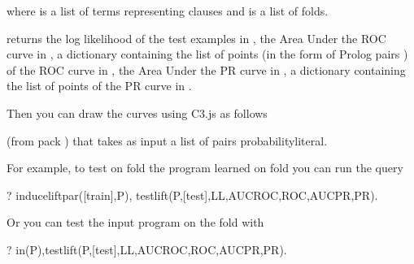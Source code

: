 \documentclass[letterpaper,10pt,english]{sphinxmanual}
\begin{document}
\sphinxAtStartPar
where  is a list of terms representing clauses and  is a list of folds.

\sphinxAtStartPar
{} returns the log likelihood of the test examples in , the Area Under the ROC curve in , a dictionary containing the list of points (in the form of Prolog pairs ) of the ROC curve in , the Area Under the PR curve in , a dictionary containing the list of points of the PR curve in .

\sphinxAtStartPar
Then you can draw the curves using C3.js as follows

\begin{sphinxVerbatim}[commandchars=\\\{\}]
  
\end{sphinxVerbatim}

\sphinxAtStartPar
(from pack ) that takes as input a list  of pairs probability\sphinxhyphen{}literal.

\sphinxAtStartPar
For example, to test on fold  the program learned on fold  you can run the query

\begin{sphinxVerbatim}[commandchars=\\\{\}]
?\PYGZhy{} induce\PYGZus{}lift\PYGZus{}par([train],P),
test\PYGZus{}lift(P,[test],LL,AUCROC,ROC,AUCPR,PR).
\end{sphinxVerbatim}

\sphinxAtStartPar
Or you can test the input program on the fold  with

\begin{sphinxVerbatim}[commandchars=\\\{\}]
?\PYGZhy{} in(P),test\PYGZus{}lift(P,[test],LL,AUCROC,ROC,AUCPR,PR).
\end{sphinxVerbatim}
\end{document}

